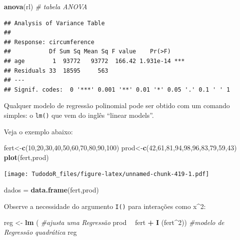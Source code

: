 \documentclass[
]{book}
\newenvironment{Shaded}{\begin{snugshade}}{\end{snugshade}}
\newcommand{\CommentTok}[1]{\textcolor[rgb]{0.56,0.35,0.01}{\textit{#1}}}
\newcommand{\DecValTok}[1]{\textcolor[rgb]{0.00,0.00,0.81}{#1}}
\newcommand{\KeywordTok}[1]{\textcolor[rgb]{0.13,0.29,0.53}{\textbf{#1}}}
\newcommand{\NormalTok}[1]{#1}
\newcommand{\OperatorTok}[1]{\textcolor[rgb]{0.81,0.36,0.00}{\textbf{#1}}}
\newcommand{\StringTok}[1]{\textcolor[rgb]{0.31,0.60,0.02}{#1}}
\begin{document}
\begin{Shaded}
\begin{Highlighting}[]
\KeywordTok{anova}\NormalTok{(rl) }\CommentTok{# tabela ANOVA}
\end{Highlighting}
\end{Shaded}

\begin{verbatim}
## Analysis of Variance Table
## 
## Response: circumference
##           Df Sum Sq Mean Sq F value    Pr(>F)    
## age        1  93772   93772  166.42 1.931e-14 ***
## Residuals 33  18595     563                      
## ---
## Signif. codes:  0 '***' 0.001 '**' 0.01 '*' 0.05 '.' 0.1 ' ' 1
\end{verbatim}

Qualquer modelo de regressão polinomial pode ser obtido com um comando
simples: o \texttt{lm()} que vem do inglês ``linear models''.

Veja o exemplo abaixo:

\begin{Shaded}
\begin{Highlighting}[]
\NormalTok{fert<-}\KeywordTok{c}\NormalTok{(}\DecValTok{10}\NormalTok{,}\DecValTok{20}\NormalTok{,}\DecValTok{30}\NormalTok{,}\DecValTok{40}\NormalTok{,}\DecValTok{50}\NormalTok{,}\DecValTok{60}\NormalTok{,}\DecValTok{70}\NormalTok{,}\DecValTok{80}\NormalTok{,}\DecValTok{90}\NormalTok{,}\DecValTok{100}\NormalTok{)}
\NormalTok{prod<-}\KeywordTok{c}\NormalTok{(}\DecValTok{42}\NormalTok{,}\DecValTok{61}\NormalTok{,}\DecValTok{81}\NormalTok{,}\DecValTok{94}\NormalTok{,}\DecValTok{98}\NormalTok{,}\DecValTok{96}\NormalTok{,}\DecValTok{83}\NormalTok{,}\DecValTok{79}\NormalTok{,}\DecValTok{59}\NormalTok{,}\DecValTok{43}\NormalTok{)}
\KeywordTok{plot}\NormalTok{(fert,prod)}
\end{Highlighting}
\end{Shaded}

\texttt{[image: TudodoR\_files/figure-latex/unnamed-chunk-419-1.pdf]}

\begin{Shaded}
\begin{Highlighting}[]
\NormalTok{dados =}\StringTok{ }\KeywordTok{data.frame}\NormalTok{(fert,prod)}
\end{Highlighting}
\end{Shaded}

Observe a necessidade do argumento \texttt{I()} para interações como x\^{}2:

\begin{Shaded}
\begin{Highlighting}[]
\NormalTok{reg <-}\StringTok{ }\KeywordTok{lm}\NormalTok{ ( }\CommentTok{#ajusta uma Regressão}
\NormalTok{        prod }\OperatorTok{~}\StringTok{ }\NormalTok{fert }\OperatorTok{+}\StringTok{ }\KeywordTok{I}\NormalTok{ (fert}\OperatorTok{^}\DecValTok{2}\NormalTok{)) }\CommentTok{#modelo de Regressão quadrática}
\NormalTok{reg}
\end{Highlighting}
\end{Shaded}
\end{document}
